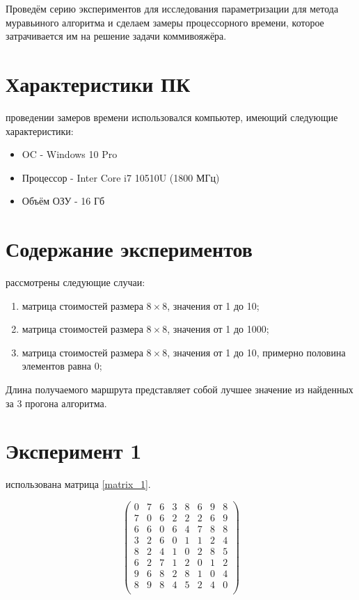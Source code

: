 Проведём серию экспериментов для исследования параметризации для метода муравьиного алгоритма и сделаем замеры процессорного времени, которое затрачивается им на решение задачи коммивояжёра.

\section{Характеристики ПК}
 проведении замеров времени использовался компьютер, имеющий следующие характеристики:
\begin{itemize}
	\item OC - Windows 10 Pro
	\item Процессор - Inter Core i7 10510U (1800 МГц)
	\item Объём ОЗУ - 16 Гб
\end{itemize}

\section{Содержание экспериментов}
 рассмотрены следующие случаи:
\begin{enumerate}
	\item матрица стоимостей размера $8 \times 8$, значения от 1 до 10;
	\item матрица стоимостей размера $8 \times 8$, значения от 1 до 1000;
	\item матрица стоимостей размера $8 \times 8$, значения от 1 до 10, примерно половина элементов равна 0;
\end{enumerate}

Длина получаемого маршрута представляет собой лучшее значение из найденных за 3 прогона алгоритма.

\section{Эксперимент 1}
 использована матрица \ref{matrix_1}.

\begin{scriptsize} 
	\begin{equation}\label{matrix_1}
		\left(
		\begin{array}{cccccccc}
			0& 7& 6& 3& 8& 6& 9& 8\\
			7& 0& 6& 2& 2& 2& 6& 9\\
			6& 6& 0& 6& 4& 7& 8& 8\\
			3& 2& 6& 0& 1& 1& 2& 4\\
			8& 2& 4& 1& 0& 2& 8& 5\\
			6& 2& 7& 1& 2& 0& 1& 2\\
			9& 6& 8& 2& 8& 1& 0& 4\\
			8& 9& 8& 4& 5& 2& 4& 0\\
		\end{array}\right)
\end{equation} \end{scriptsize}

